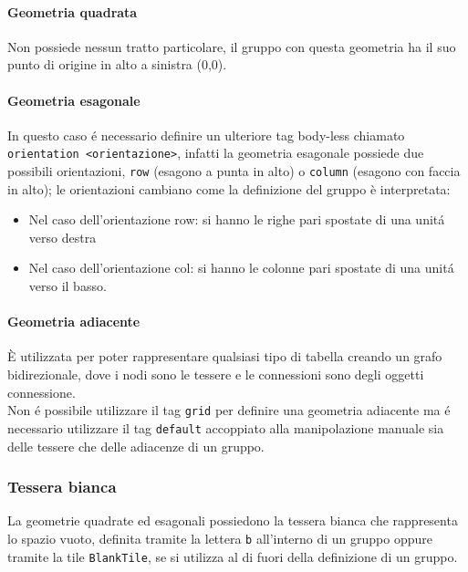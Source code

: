 \paragraph{Geometria quadrata}
Non possiede nessun tratto particolare, 
il gruppo con questa geometria ha il suo punto di origine in alto a sinistra (0,0). 

\paragraph{Geometria esagonale}
In questo caso é necessario definire un ulteriore tag body-less chiamato \lstinline|orientation <orientazione>|,
infatti la geometria esagonale possiede due possibili orientazioni, \lstinline|row| (esagono a punta in alto) 
o \lstinline|column| (esagono con faccia in alto); 
le orientazioni cambiano come la definizione del gruppo è interpretata:
\begin{itemize}
    \item Nel caso dell'orientazione row: si hanno le righe pari spostate di una unitá verso destra
    \item Nel caso dell'orientazione col: si hanno le colonne pari spostate di una unitá verso il basso.
\end{itemize}

\begin{figure}[h]
\begin{center}
\end{center}    
\end{figure}

\paragraph{Geometria adiacente}
È utilizzata per poter rappresentare qualsiasi tipo di tabella creando un grafo bidirezionale, dove
i nodi sono le tessere e le connessioni sono degli oggetti connessione. \\ 
Non é possibile utilizzare il tag \lstinline|grid| per definire una geometria adiacente ma é 
necessario utilizzare il tag \lstinline|default| accoppiato
alla manipolazione manuale sia delle tessere che delle adiacenze di un gruppo.

\subsubsection{Tessera bianca}
La geometrie quadrate ed esagonali possiedono la tessera bianca che rappresenta lo spazio vuoto, 
definita tramite la lettera \lstinline|b| all'interno di un gruppo oppure tramite la tile \lstinline{BlankTile},
se si utilizza al di fuori della definizione di un gruppo.  

